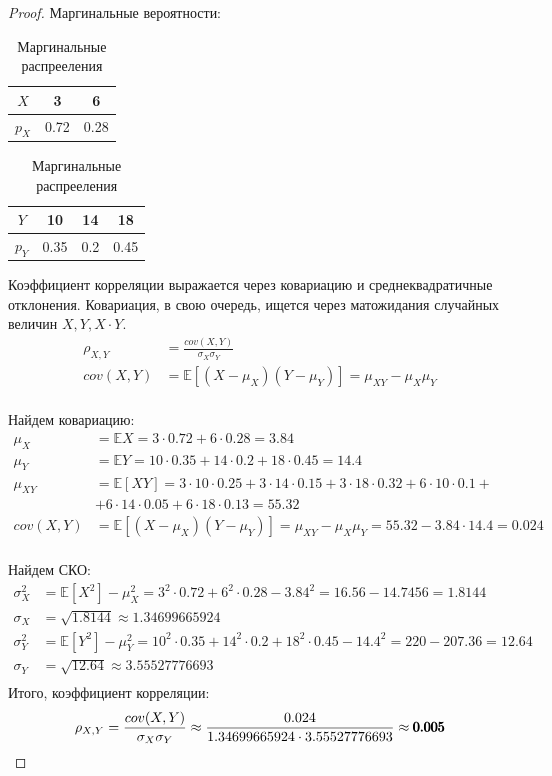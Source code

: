 \documentclass[a4paper,12pt]{article}
\newenvironment{solution}{\renewcommand{\proofname}{\unskip\indent\nopunct}\begin{proof}}{\end{proof}}
\begin{document}
\begin{solution}

Маргинальные вероятности:
\begin{table}[h!]
    \centering
    \begin{tabular}{|c|c|c|}
        \hline
        $X$ & 3 & 6 \\
        \hline
        $p_X$ & 0.72 & 0.28 \\
        \hline
    \end{tabular}
    \quad
    \begin{tabular}{|c|c|c|c|}
        \hline
        $Y$ & 10 & 14 & 18 \\
        \hline
        $p_Y$ & 0.35 & 0.2 & 0.45 \\
        \hline
    \end{tabular}
    \caption{Маргинальные распрееления}
\end{table}

Коэффициент корреляции выражается через ковариацию и среднеквадратичные отклонения.
Ковариация, в свою очередь, ищется через матожидания случайных величин $X, Y, X \cdot Y$.
\begin{align*}
    \rho_{X, Y} &= \frac{cov(X, Y)}{\sigma_X \sigma_Y} \\
    cov(X, Y) &= \mathbb E[(X - \mu_X)(Y - \mu_Y)] = \mu_{XY} - \mu_X \mu_Y \\
\end{align*}

Найдем ковариацию:
\begin{align*}
    \mu_X &= \mathbb EX = 3 \cdot 0.72 + 6 \cdot 0.28 = 3.84 \\
    \mu_Y &= \mathbb EY = 10 \cdot 0.35 + 14 \cdot 0.2 + 18 \cdot 0.45 = 14.4 \\
    \mu_{XY} &= \mathbb E[XY] = 3 \cdot 10 \cdot 0.25 + 3 \cdot 14 \cdot 0.15 + 3 \cdot 18 \cdot 0.32 + 6 \cdot 10 \cdot 0.1 + \\
    & + 6 \cdot 14 \cdot 0.05 + 6 \cdot 18 \cdot 0.13 = 55.32 \\
    cov(X, Y) &= \mathbb E[(X - \mu_X)(Y - \mu_Y)] = \mu_{XY} - \mu_X \mu_Y = 55.32 - 3.84 \cdot 14.4 = 0.024 \\
\end{align*}

Найдем СКО:
\begin{align*}
    \sigma^2_X &= \mathbb E[X^2] - \mu_X^2 = 3^2 \cdot 0.72 + 6^2 \cdot 0.28 - 3.84^2 = 16.56 - 14.7456 = 1.8144 \\
    \sigma_X &= \sqrt{1.8144} \approx 1.34699665924 \\
    \sigma^2_Y &= \mathbb E[Y^2] - \mu_Y^2 = 10^2 \cdot 0.35 + 14^2 \cdot 0.2 + 18^2 \cdot 0.45 - 14.4^2 = 220 - 207.36 = 12.64 \\
    \sigma_Y &= \sqrt{12.64} \approx 3.55527776693 \\
\end{align*}
Итого, коэффициент корреляции:
\[
    \rho_{X, Y} = \frac{cov(X, Y)}{\sigma_X \sigma_Y} \approx \frac{0.024}{1.34699665924 \cdot 3.55527776693} \approx \pmb{0.005} \\
\]


\end{solution}
\end{document}
